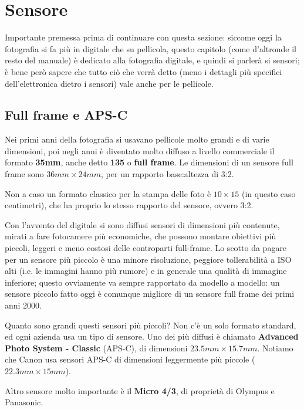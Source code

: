 \section{Sensore} \label{sec:sensore}
Importante premessa prima di continuare con questa sezione: siccome oggi la fotografia si fa più in digitale che su pellicola, questo capitolo (come d'altronde il resto del manuale) è dedicato alla fotografia digitale, e quindi si parlerà si sensori; è bene però sapere che tutto ciò che verrà detto (meno i dettagli più specifici dell'elettronica dietro i sensori) vale anche per le pellicole.


\subsection{Full frame e APS-C} \label{subsec:sensorifullaps}
Nei primi anni della fotografia si usavano pellicole molto grandi e di varie dimensioni, poi negli anni è diventato molto diffuso a livello commerciale il formato \textbf{35mm}, anche detto \textbf{135} o \textbf{full frame}.
Le dimensioni di un sensore full frame sono $36mm \times 24mm$, per un rapporto base:altezza di 3:2.

Non a caso un formato classico per la stampa delle foto è $10 \times 15$ (in questo caso centimetri), che ha proprio lo stesso rapporto del sensore, ovvero 3:2.

Con l'avvento del digitale si sono diffusi sensori di dimensioni più contenute, mirati a fare fotocamere più economiche, che possono montare obiettivi più piccoli, leggeri e meno costosi delle controparti full-frame.
Lo scotto da pagare per un sensore più piccolo è una minore risoluzione, peggiore tollerabilità a ISO alti (i.e. le immagini hanno più rumore) e in generale una qualità di immagine inferiore; questo ovviamente va sempre rapportato da modello a modello: un sensore piccolo fatto oggi è comunque migliore di un sensore full frame dei primi anni 2000.

Quanto sono grandi questi sensori più piccoli? Non c'è un solo formato standard, ed ogni azienda usa un tipo di sensore.
Uno dei più diffusi è chiamato \textbf{Advanced Photo System - Classic} (APS-C), di dimensioni $23.5mm \times 15.7mm$. Notiamo che Canon usa sensori APS-C di dimensioni leggermente più piccole ($22.3mm \times 15mm$).

Altro sensore molto importante è il \textbf{Micro 4/3}, di proprietà di Olympus e Panasonic.

